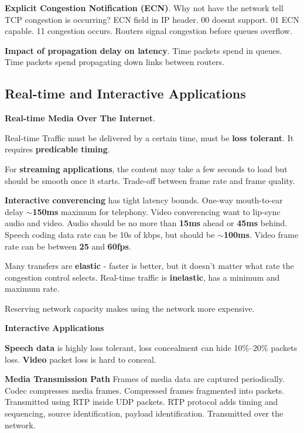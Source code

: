 \documentclass{article}
\begin{document}
\vspace{\baselineskip}
\textbf{Explicit Congestion Notification (ECN)}.
Why not have the network tell TCP congestion is occurring? ECN field in IP header.
00 doesnt support.
01 ECN capable.
11 congestion occurs.
Routers signal congestion before queues overflow.

\vspace{\baselineskip}
\textbf{Impact of propagation delay on latency}.
Time packets spend in queues.
Time packets spend propagating down links between routers.

\clearpage

\subsection*{Real-time and Interactive Applications}

\textbf{Real-time Media Over The Internet}.

Real-time Traffic must be delivered by a certain time, must be \textbf{loss tolerant}.
It requires \textbf{predicable timing}.

For \textbf{streaming applications}, the content may take a few seconds to load but should be smooth once it starts.
Trade-off between frame rate and frame quality.

\textbf{Interactive converencing} has tight latency bounds.
One-way mouth-to-ear delay \textbf{$\sim$150ms} maximum for telephony.
Video converencing want to lip-sync audio and video.
Audio should be no more than \textbf{15ms} ahead or \textbf{45ms} behind.
Speech coding data rate can be 10s of kbps, but should be \textbf{$\sim$100ms}.
Video frame rate can be between \textbf{25} and \textbf{60fps}.

Many transfers are \textbf{elastic} {-} faster is better, but it doesn't matter what rate the congestion control selects.
Real-time traffic is \textbf{inelastic}, has a minimum and maximum rate.

Reserving network capacity makes using the network more expensive.

\vspace{\baselineskip}
\textbf{Interactive Applications}

\textbf{Speech data} is highly loss tolerant, loss concealment can hide 10\%--20\% packets loss.
\textbf{Video} packet loss is hard to conceal.

\textbf{Media Transmission Path}
Frames of media data are captured periodically.
Codec compresses media frames.
Compressed frames fragmented into packets.
Transmitted using RTP inside UDP packets.
RTP protocol adds timing and sequencing, source identification, payload identification.
Transmitted over the network.
\end{document}
